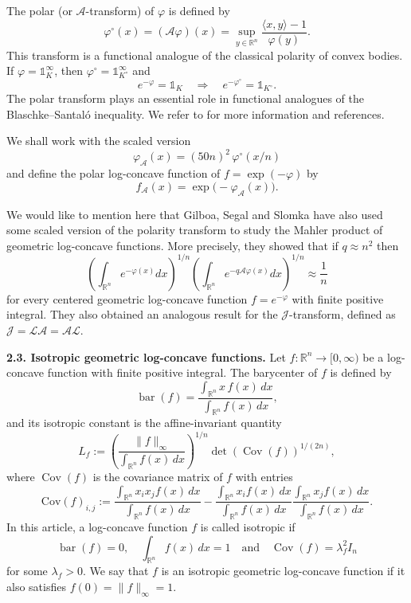 \documentclass[11pt,leqno]{article}
\theoremstyle{definition}
\theoremstyle{remark}
\numberwithin{equation}{section}
\begin{document}
\smallskip 

The polar (or $\mathcal{A}$-transform) of $\varphi$ is defined by
$$\varphi^{\circ}(x)=(\mathcal{A}\varphi)(x)=\sup_{y\in\mathbb{R}^n}\frac{\langle x,y\rangle -1}{\varphi(y)}.$$
This transform is a functional analogue of the classical polarity of convex bodies.  
If $\varphi = \mathds{1}_K^\infty$, then $\varphi^\circ = \mathds{1}_{K^\circ}^\infty$ and  
$$e^{-\varphi} = \mathds{1}_K\quad\Longrightarrow\quad e^{-\varphi^\circ} = \mathds{1}_{K^\circ}.$$
The polar transform plays an essential role in functional 
analogues of the Blaschke--Santal\'{o} inequality. We refer to \cite[Chapter~9]{AGA-book-2} for 
more information and references.

We shall work with the scaled version  
$$\varphi_{\mathcal{A}}(x)=(50n)^2\, \varphi^{\circ}(x/n)$$
and define the polar log-concave function of $f=\exp(-\varphi)$ by
$$f_{\mathcal{A}}(x)=\exp\big(-\varphi_{\mathcal{A}}(x)\big).$$

We would like to mention here that Gilboa, Segal and Slomka \cite{Gilboa-Segal-Slomka-2025} 
have also used some scaled version of the polarity transform to study the Mahler product
of geometric log-concave functions. More precisely, they showed that if $q\approx n^2$ then
$$\left(\int_{\mathbb{R}^n}e^{-\varphi(x)}dx\right)^{1/n}\left(\int_{\mathbb{R}^n}e^{-q\mathcal{A}\varphi(x)}dx\right)^{1/n}
\approx\frac{1}{n}$$
for every centered geometric log-concave function $f=e^{-\varphi}$ with finite positive integral.
They also obtained an analogous result for the $\mathcal{J}$-transform, defined as 
$\mathcal{J}=\mathcal{L}\mathcal{A}=\mathcal{A}\mathcal{L}$.

\bigskip 

\textbf{2.3. Isotropic geometric log-concave functions.} Let $f:\mathbb{R}^n\to [0,\infty)$ be a log-concave function 
with finite positive integral. The barycenter of $f$ is defined by
\[
\operatorname{bar}(f)
= \frac{\int_{\mathbb{R}^n} x\, f(x)\, dx}{\int_{\mathbb{R}^n} f(x)\, dx},
\]
and its isotropic constant is the affine-invariant quantity
\begin{equation}\label{eq:definition-isotropic}
L_f:= \left( \frac{\|f\|_{\infty}}{\int_{\mathbb{R}^n} f(x)\, dx} \right)^{1/n}
\det(\operatorname{Cov}(f))^{1/(2n)},
\end{equation}
where $\operatorname{Cov}(f)$ is the covariance matrix of $f$ with entries
\begin{equation*}
\textrm{Cov}(f)_{i,j}:=\frac{\int_{\mathbb{R}^n}x_ix_j f(x)\,dx}{\int_{\mathbb{R}^n} f(x)\,dx}-\frac{\int_{\mathbb{R}^n}x_i f(x)\,dx}{\int_{\mathbb{R}^n} f(x)\,dx}\frac{\int_{\mathbb{R}^n}x_j f(x)\,dx}{\int_{\mathbb{R}^n} f(x)\,dx}.
\end{equation*} In this article, a log-concave function $f$ is called isotropic if
$$\operatorname{bar}(f)=0,\quad \int_{\mathbb{R}^n}f(x)\,dx=1\quad \text{and} \quad \operatorname{Cov}(f)=\lambda_f^2 I_n$$
for some $\lambda_f>0$.  We  say that $f$ is an isotropic geometric log-concave function if it also satisfies
$f(0)=\|f\|_{\infty}=1$.
\end{document}
